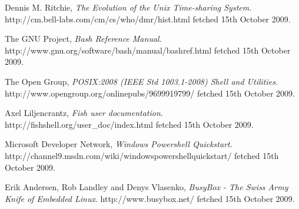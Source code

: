 \documentclass[12pt]{article}
\begin{document}
\begin{thebibliography}{9} %

  Dennis M. Ritchie,
  \emph{The Evolution of the Unix Time-sharing System}.
  http://cm.bell-labs.com/cm/cs/who/dmr/hist.html fetched 15th October
  2009.

  The GNU Project,
  \emph{Bash Reference Manual}.
  http://www.gnu.org/software/bash/manual/bashref.html fetched 15th
  October 2009.
 
  The Open Group,
  \emph{POSIX:2008 (IEEE Std 1003.1-2008) Shell and Utilities}.
  http://www.opengroup.org/onlinepubs/9699919799/ fetched 15th October
  2009.

  Axel Liljencrantz,
  \emph{Fish user documentation}.
  http://fishshell.org/user\_doc/index.html fetched 15th October 2009.

  Microsoft Developer Network,
  \emph{Windows Powershell Quickstart}.
  http://channel9.msdn.com/wiki/windowspowershellquickstart/ fetched
  15th October 2009.

  Erik Andersen, Rob Landley and Denys Vlasenko,
  \emph{BusyBox - The Swiss Army Knife of Embedded Linux}.
  http://www.busybox.net/ fetched 15th October 2009.

\end{thebibliography}
\end{document}
